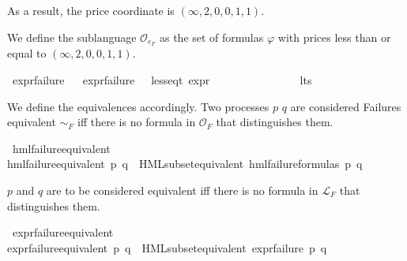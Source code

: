 \begin{isabellebody}
\begin{isamarkuptext}
As a result, the price coordinate is $(\infty, 2, 0, 0, 1, 1)$.%
\end{isamarkuptext}\isamarkuptrue%
%
\begin{isamarkuptext}%
We define the sublanguage $\mathcal{O}_{e_F}$ as the set of formulas $\varphi$ with prices less than or equal to $(\infty, 2, 0, 0, 1, 1)$.%
\end{isamarkuptext}\isamarkuptrue%
\isamarkupfalse%
\ expr{\isacharunderscore}{\kern0pt}failure\isanewline
\ \ \isanewline
{\isachardoublequoteopen}expr{\isacharunderscore}{\kern0pt}failure\ {\isacharequal}{\kern0pt}\ {\isacharbraceleft}{\kern0pt}{\isasymphi}{\isachardot}{\kern0pt}\ {\isacharparenleft}{\kern0pt}less{\isacharunderscore}{\kern0pt}eq{\isacharunderscore}{\kern0pt}t\ {\isacharparenleft}{\kern0pt}expr\ {\isasymphi}{\isacharparenright}{\kern0pt}\ {\isacharparenleft}{\kern0pt}{\isasyminfinity}{\isacharcomma}{\kern0pt}\ {}{\isacharcomma}{\kern0pt}\ {}{\isacharcomma}{\kern0pt}\ {}{\isacharcomma}{\kern0pt}\ {}{\isacharcomma}{\kern0pt}\ {}{\isacharparenright}{\kern0pt}{\isacharparenright}{\kern0pt}{\isacharbraceright}{\kern0pt}{\isachardoublequoteclose}\isanewline
\ \ \ \ \ \ \ \isanewline
{}\isamarkupfalse%
\ lts\isanewline
{}%
\begin{isamarkuptext}%
We define the equivalences accordingly. Two processes $p$ $q$ are considered Failures equivalent $\sim_F$ iff there is no formula in $\mathcal{O}_F$ that distinguishes them.%
\end{isamarkuptext}\isamarkuptrue%
\isamarkupfalse%
\ hml{\isacharunderscore}{\kern0pt}failure{\isacharunderscore}{\kern0pt}equivalent\isanewline
\ \ \isanewline
{\isachardoublequoteopen}hml{\isacharunderscore}{\kern0pt}failure{\isacharunderscore}{\kern0pt}equivalent\ p\ q\ {\isasymequiv}\ HML{\isacharunderscore}{\kern0pt}subset{\isacharunderscore}{\kern0pt}equivalent\ hml{\isacharunderscore}{\kern0pt}failure{\isacharunderscore}{\kern0pt}formulas\ p\ q{\isachardoublequoteclose}%
\begin{isamarkuptext}%
$p$ and $q$ are to be considered equivalent iff there is no formula in $\mathcal{L}_F$ that distinguishes them.%
\end{isamarkuptext}\isamarkuptrue%
\isamarkupfalse%
\ expr{\isacharunderscore}{\kern0pt}failure{\isacharunderscore}{\kern0pt}equivalent\ \isanewline
\ \ \isanewline
{\isachardoublequoteopen}expr{\isacharunderscore}{\kern0pt}failure{\isacharunderscore}{\kern0pt}equivalent\ p\ q\ {\isasymequiv}\ HML{\isacharunderscore}{\kern0pt}subset{\isacharunderscore}{\kern0pt}equivalent\ expr{\isacharunderscore}{\kern0pt}failure\ p\ q{\isachardoublequoteclose}\isanewline

\end{isabellebody}
